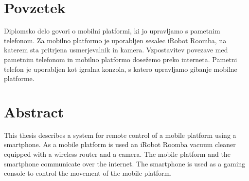 \documentclass[a4paper, 12pt]{book}
\newcommand{\clearemptydoublepage}{\newpage{\pagestyle{empty}\cleardoublepage}}
\begin{document}
\def\thepage{}%
\tableofcontents{}


\clearemptydoublepage

\chapter*{Povzetek}
Diplomsko delo govori o mobilni platformi, ki jo upravljamo s pametnim telefonom. Za mobilno platformo je uporabljen sesalec iRobot Roomba, na katerem sta pritrjena usmerjevalnik in kamera. Vzpostavitev povezave med pametnim telefonom in mobilno platformo dosežemo preko interneta. Pametni telefon je uporabljen kot igralna konzola, s katero upravljamo gibanje mobilne platforme. 
\clearemptydoublepage

\chapter*{Abstract}
This thesis describes a system for remote control of a mobile platform using a smartphone. As a mobile platform is used an iRobot Roomba vacuum cleaner equipped with a wireless router and a camera. The mobile platform and the smartphone communicate over the internet. The smartphone is used as a gaming console to control the movement of the mobile platform. 
\clearemptydoublepage

\mainmatter
\setcounter{page}{1}
\pagestyle{fancy}
\end{document}
